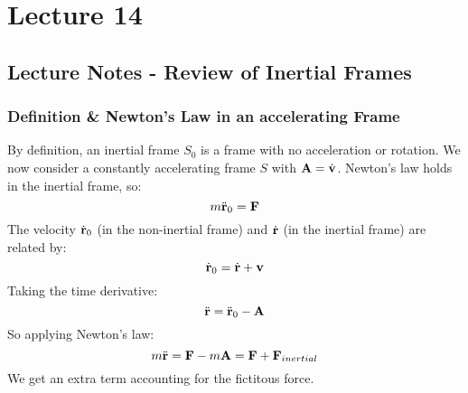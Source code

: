 \documentclass[../PHYS306Notes.tex]{subfiles}
\begin{document}
\section{Lecture 14}
\subsection{Lecture Notes - Review of Inertial Frames}
\subsubsection{Definition \& Newton's Law in an accelerating Frame}
By definition, an inertial frame $S_0$ is a frame with no acceleration or rotation. We now consider a constantly accelerating frame $S$ with $\mathbf{A} = \dot{\mathbf{v}}$. Newton's law holds in the inertial frame, so:
\[m\ddot{\mathbf{r}}_0 = \mathbf{F}\]
The velocity $\dot{\mathbf{r}}_0$ (in the non-inertial frame) and $\dot{\mathbf{r}}$ (in the inertial frame) are related by:
\[\dot{\mathbf{r}}_0 = \dot{\mathbf{r}} + \mathbf{v}\]
Taking the time derivative:
\[\ddot{\mathbf{r}} = \ddot{\mathbf{r}}_0 - \mathbf{A}\]
So applying Newton's law:
\[m\ddot{\mathbf{r}} = \mathbf{F} - m\mathbf{A} = \mathbf{F} + \mathbf{F}_{inertial}\]
We get an extra term accounting for the fictitous force.
\end{document}
